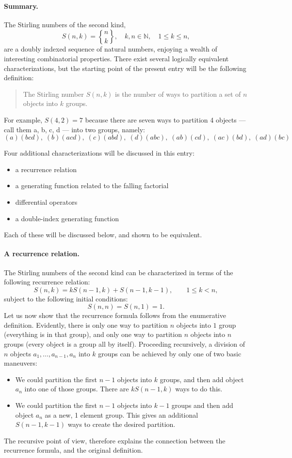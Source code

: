\documentclass[12pt]{article}
\newcommand{\natnums}{\mathbb{N}}
\begin{document}
\paragraph{Summary.}
The Stirling numbers of the second kind, 
$$S(n,k) = {n \brace k}, \quad k,n\in\natnums,\quad 1\leq k\leq n,$$
are a doubly
indexed sequence of natural numbers, enjoying a wealth of interesting
combinatorial properties.  There exist several logically equivalent
characterizations, but the starting point of the present entry will
be the following definition:
\begin{quote}
  The Stirling number $S(n,k)$ is the number of ways to partition a set
  of $n$ objects into $k$ groups.
\end{quote}
For example, $S(4,2) = 7$ because there are seven ways to partition 4
objects --- call them a, b, c, d --- into two groups, namely:
$$
(a)(bcd),\;
(b)(acd),\;
(c)(abd),\;
(d)(abc),\;
(ab)(cd),\;
(ac)(bd),\;
(ad)(bc)
$$

Four additional characterizations will be discussed in this entry:
\begin{itemize}
\item a recurrence relation
\item a generating function related to the falling factorial
\item differential operators
\item  a double-index generating function
\end{itemize}
Each of these will be discussed below, and shown to be equivalent.
\paragraph{A recurrence relation.}
The Stirling numbers of the second kind can be characterized in terms of
the following recurrence relation:
$$S(n,k) = kS(n-1,k) + S(n-1,k-1),\qquad 1\leq k < n,$$
subject to the
following initial conditions:
$$S(n,n) = S(n,1) = 1.$$
Let us now show that the recurrence formula
follows from the enumerative definition.  Evidently, there is only one
way to partition $n$ objects into $1$ group (everything is in that
group), and only one way to partition $n$ objects into $n$ groups
(every object is a group all by itself). Proceeding recursively, a
division of $n$ objects $a_1, \ldots, a_{n-1}, a_n$ into $k$ groups
can be achieved by only one of two basic maneuvers:
\begin{itemize}
\item We could partition the first $n-1$ objects into $k$ groups, and
  then add object $a_n$ into one of those groups.  There are $k
  S(n-1,k)$ ways to do this.
\item We could partition the first $n-1$ objects into $k-1$ groups and
  then add object $a_n$ as a new, 1 element group.  This gives an
  additional 
  $S(n-1,k-1)$ ways to create the desired partition.
\end{itemize}
The recursive point of view, therefore explains the connection between
the recurrence formula, and the original definition.  
\end{document}
